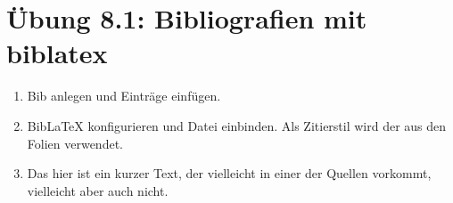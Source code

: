 \documentclass{article}
\begin{document}
\section*{Übung 8.1: Bibliografien mit biblatex}
\begin{enumerate}[label=\alph*)]
    \item Bib anlegen und Einträge einfügen.
    \item Bib\LaTeX{} konfigurieren und Datei einbinden. Als Zitierstil wird der aus den Folien verwendet.
    \item Das hier ist ein kurzer Text, der vielleicht in einer der Quellen vorkommt, vielleicht aber auch nicht. \parencite{8869134}
\end{enumerate}

\printbibliography
\end{document}
